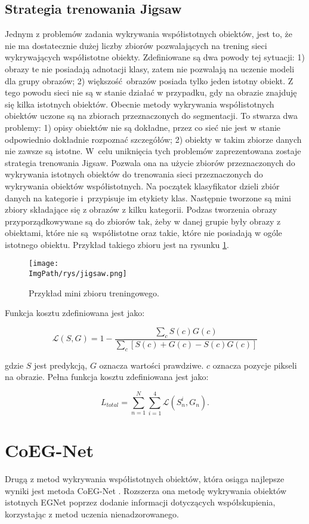 \documentclass[a4paper,12pt,twoside,openany]{report}
\newcommand{\ImgPath}{.}
\begin{document}
\subsection{Strategia trenowania Jigsaw}
Jednym z problemów zadania wykrywania współistotnych obiektów, jest to, że nie ma dostatecznie dużej liczby zbiorów pozwalających na trening sieci wykrywających współistotne obiekty. Zdefiniowane są dwa powody tej sytuacji: 1) obrazy te nie posiadają adnotacji klasy, zatem nie pozwalają na uczenie modeli dla grupy obrazów; 2) większość obrazów posiada tylko jeden istotny obiekt. Z tego powodu sieci nie są w stanie działać w przypadku, gdy na obrazie znajduję się kilka istotnych obiektów. Obecnie metody wykrywania współistotnych obiektów uczone są na zbiorach przeznaczonych do segmentacji. To stwarza dwa problemy: 1) opisy obiektów nie są dokładne, przez co sieć nie jest w stanie odpowiednio dokładnie rozpoznać szczegółów; 2) obiekty w takim zbiorze danych nie zawsze są istotne. W~celu uniknięcia tych problemów zaprezentowana zostaje strategia trenowania Jigsaw. Pozwala ona na użycie zbiorów przeznaczonych do wykrywania istotnych obiektów do trenowania sieci przeznaczonych do wykrywania obiektów współistotnych. Na początek klasyfikator dzieli zbiór danych na kategorie i~przypisuje im etykiety klas. Następnie tworzone są mini zbiory składające się z obrazów z kilku kategorii. Podzas tworzenia obrazy przyporządkowywane są do zbiorów tak, żeby w danej grupie były obrazy z obiektami, które nie są współistotne oraz takie, które nie posiadają w ogóle istotnego obiektu. Przykład takiego zbioru jest na rysunku \ref{jigsaw}.

\begin{figure}[h]
	\centering
	\texttt{[image: \\ImgPath/rys/jigsaw.png]}
	\caption{Przykład mini zbioru treningowego.}
	\label{jigsaw}
\end{figure}

Funkcja kosztu zdefiniowana jest jako:

$$
\mathcal{L}(S, G) = 1 - \frac{\sum_cS(c)G(c)}{\sum_c \left[S(c) + G(c) - S(c)G(c)\right]}
$$

gdzie $S$ jest predykcją, $G$ oznacza wartości prawdziwe. $c$ oznacza pozycje pikseli na obrazie. Pełna funkcja kosztu zdefiniowana jest jako:

$$
L_{total}=\sum^N_{n=1}\sum^4_{i=1}\mathcal{L}(S_n^i, G_n).
$$

\section{CoEG-Net}
Drugą z metod wykrywania współistotnych obiektów, która osiąga najlepsze wyniki jest metoda CoEG-Net \cite{fan2020rethinking}. Rozszerza ona metodę wykrywania obiektów istotnych EGNet \cite{zhao2019egnetedge} poprzez dodanie informacji dotyczących współskupienia, korzystając z metod uczenia nienadzorowanego.
\end{document}
